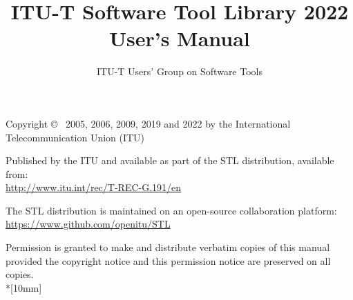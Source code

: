 \documentclass[12pt,a4paper]{book}
\begin{document}
\SF

\def\sixsf{\footnotesize\tt}
\def\tenrm{\small\tt}
\def\twlsf{\sf}


\title{ITU-T Software Tool Library 2022 User's Manual}
\author{ITU-T Users' Group on Software Tools}

\maketitle
\thispagestyle{empty}


 Copyright \copyright~ 2005, 2006, 2009, 2019 and 2022 by the International
 Telecommunication Union (ITU)



Published by the ITU and available as part of the STL distribution, available from: \\
\url{http://www.itu.int/rec/T-REC-G.191/en}

The STL distribution is maintained on an open-source collaboration platform:\\
\url{https://www.github.com/openitu/STL}

Permission is granted to make and distribute verbatim copies of this manual provided the copyright notice and this permission notice are preserved on all copies.\\*[10mm]

\tableofcontents

\def\long{{\tt long}}

\cleardoublepage
{}
\setcounter{page}{1}



\end{document}
